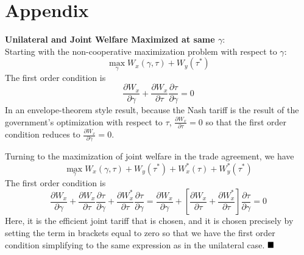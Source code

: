 \documentclass[12pt,titlepage]{article}
\newcommand{\ga}{\gamma}
\begin{document}
\section{Appendix}
\noindent \textbf{\hypertarget{envelope}{Unilateral and Joint Welfare Maximized at same $\ga$}}: \\
Starting with the non-cooperative maximization problem with respect to $\ga$:
\[
 \max_{\ga} W_x(\ga,\tau) + W_y(\tau^*)
\]
The first order condition is
\[
	\frac{\partial W_x}{\partial \ga} + \frac{\partial W_x}{\partial \tau}\frac{\partial \tau}{\partial \ga} = 0
\]
In an envelope-theorem style result, because the Nash tariff is the result of the government's optimization with respect to $\tau$, $\frac{\partial W_x}{\partial \tau}=0$ so that the first order condition reduces to $\frac{\partial W_x}{\partial \ga} = 0$.
				
Turning to the maximization of joint welfare in the trade agreement, we have
\[
  \max_{\ga} W_x(\ga,\tau) + W_y(\tau^*) + W_x^*(\tau)+ W_y^*(\tau^*)
\]
The first order condition is 
\[
  \frac{\partial W_x}{\partial \ga} + \frac{\partial W_x}{\partial \tau}\frac{\partial \tau}{\partial \ga} + \frac{\partial W_x^*}{\partial \tau}\frac{\partial \tau}{\partial \ga} = \frac{\partial W_x}{\partial \ga} + \left[ \frac{\partial W_x}{\partial \tau} + \frac{\partial W_x^*}{\partial \tau}\right]\frac{\partial \tau}{\partial \ga} = 0
\]
Here, it is the efficient joint tariff that is chosen, and it is chosen precisely by setting the term in brackets equal to zero so that we have the first order condition simplifying to the same expression as in the unilateral case. $\hfill\blacksquare$
\end{document}
